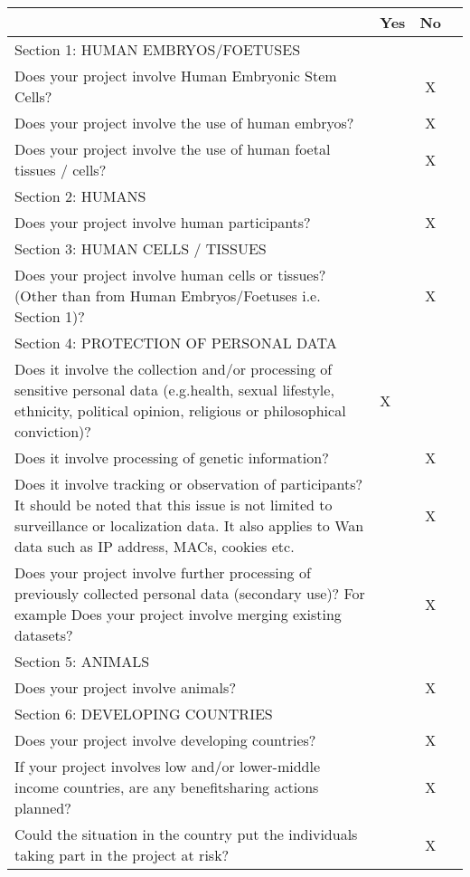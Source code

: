 \centering
\begin{tabular}{|p{350pt}|l|c|c|}
    \hline 
    &Yes&No\\
    \hline  
    Section 1: HUMAN EMBRYOS/FOETUSES& & \\
    \hline 
    Does your project involve Human Embryonic Stem Cells?& & X\\
    \hline
    Does your project involve the use of human embryos? &&X\\
    \hline
    Does your project involve the use of human foetal tissues / cells?&&X\\
    \hline
    Section 2: HUMANS &&\\
    \hline
    Does your project involve human participants? &&X\\
    \hline
    Section 3: HUMAN CELLS / TISSUES &&\\
    \hline
    Does your project involve human cells or tissues? (Other than from Human Embryos/Foetuses i.e. Section 1)? &&X\\
    \hline
    Section 4: PROTECTION OF PERSONAL DATA &&\\
    \hline
    Does it involve the collection and/or processing of sensitive personal data (e.g.health, sexual lifestyle, ethnicity, political opinion, religious or philosophical conviction)? &X&\\
    \hline
    Does it involve processing of genetic information? &&X\\
    \hline
    Does it involve tracking or observation of participants? It should be noted that this issue is not limited to surveillance or localization data. It also applies to Wan data such as IP address, MACs, cookies etc. &&X\\
    \hline
    Does your project involve further processing of previously collected personal data (secondary use)? For example Does your project involve merging existing datasets? &&X\\
    \hline
    Section 5: ANIMALS &&\\
    \hline
    Does your project involve animals? &&X\\
    \hline
    Section 6: DEVELOPING COUNTRIES &&\\
    \hline
    Does your project involve developing countries? &&X\\
    \hline
    If your project involves low and/or lower-middle income countries, are any benefitsharing actions planned? &&X\\
    \hline
    Could the situation in the country put the individuals taking part in the project at risk? &&X\\

\end{tabular}
